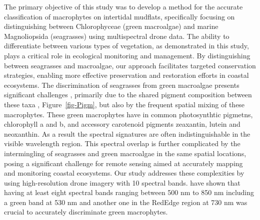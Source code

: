 \documentclass[
  number]{elsarticle}
\begin{document}
The primary objective of this study was to develop a method for the
accurate classification of macrophytes on intertidal mudflats,
specifically focusing on distinguishing between Chlorophyceae (green
macroalgae) and marine Magnoliopsida (seagrasses) using multispectral
drone data. The ability to differentiate between various types of
vegetation, as demonstrated in this study, plays a critical role in
ecological monitoring and management. By distinguishing between
seagrasses and macroalgae, our approach facilitates targeted
conservation strategies, enabling more effective preservation and
restoration efforts in coastal ecosystems. The discrimination of
seagrasses from green macroalgae presents significant challenges
\citetext{\citealp[ ]{oiry2021using}; \citealp[
]{bannari2022}; \citealp{veettil2020opportunities}}, primarily due to
the shared pigment composition between these taxa
, Figure~\ref{fig-Pigm}, but also by the frequent spatial mixing of
these macrophytes. These green macrophytes have in common photosynthtic
pigmetns, chlorophyll a and b, and accessory carotenoid pigments
zeaxantin, lutein and neoxanthin. As a result the spectral signatures
are often indistinguishable in the visible wavelength region. This
spectral overlap is further complicated by the intermingling of
seagrasses and green macroalgae in the same spatial locations, posing a
significant challenge for remote sensing aimed at accurately mapping and
monitoring coastal ecosystems. Our study addresses these complexities by
using high-resolution drone imagery with 10 spectral bands.
\citep{Davies2023} have shown that having at least eight spectral bands
ranging between 500 nm to 850 nm including a green band at 530 nm and
another one in the RedEdge region at 730 nm was crucial to accurately
discriminate green macrophytes.
\end{document}
